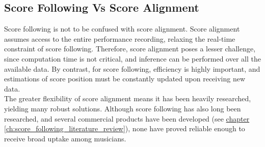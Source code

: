 



\subsection{Score Following Vs Score Alignment}{\label{subsection:score_following_v_alignment}}
Score following is not to be confused with score alignment. Score alignment assumes access to the entire performance recording, relaxing the real-time constraint of score following. Therefore, score alignment poses a lesser challenge, since computation time is not critical, and inference can be performed over all the available data. By contrast, for score following, efficiency is highly important, and estimations of score position must be constantly updated upon receiving new data.\\

The greater flexibility of score alignment means it has been heavily researched, yielding many robust solutions. Although score following has also long been researched, and several commercial products have been developed (see \hyperref[ch:score_following_literature_review]{chapter \ref*{ch:score_following_literature_review}}), none have proved reliable enough to receive broad uptake among musicians.

